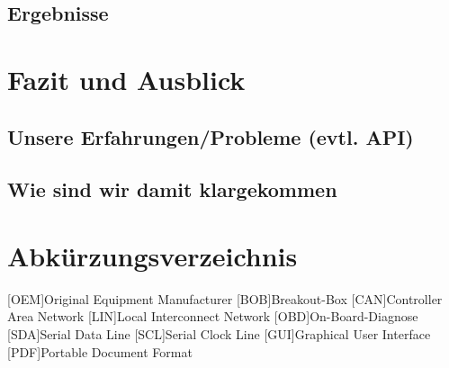 \documentclass[a4paper,oneside,12pt]{report}
\renewcommand{\lstlistingname}{Programmcode}
\renewcommand{\lstlistlistingname}{\lstlistingname}
\begin{document}
		\section{Ergebnisse}
		
	


	\chapter{Fazit und Ausblick}
	
		\section{Unsere Erfahrungen/Probleme (evtl. API)}

		\section{Wie sind wir damit klargekommen}

	
	
	
	
	\clearpage
	\listoffigures
	
	
	
	\clearpage
	\renewcommand{\lstlistingname}{Programmcodeverzeichnis}
	\lstlistoflistings
	\renewcommand{\lstlistlistingname}{\lstlistingname}
	
	
	
	\chapter*{Abkürzungsverzeichnis}
		\vspace{1.0cm}
		\begin{acronym}[SEPSEP]
			[OEM]{Original Equipment Manufacturer}
			[BOB]{Breakout-Box}
			[CAN]{Controller Area Network}
			[LIN]{Local Interconnect Network}
			[OBD]{On-Board-Diagnose}	
			[SDA]{Serial Data Line}
			[SCL]{Serial Clock Line}
			[GUI]{Graphical User Interface}
			[PDF]{Portable Document Format}
		\end{acronym}
	
\end{document}

